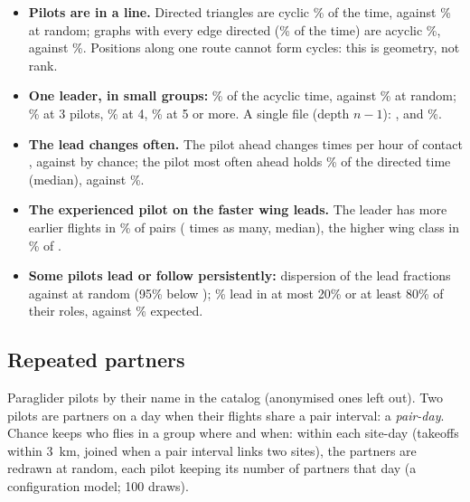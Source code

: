 \begin{itemize}
  \item \textbf{Pilots are in a line.} Directed triangles are cyclic \StCyclic\% \StCyclicBand{} of the
        time, against \StCyclicNull\% at random; graphs with every edge directed (\StFullShare\% of the
        time) are acyclic \StAcyclic\%, against \StAcyclicNull\%. Positions along one route cannot form
        cycles: this is geometry, not rank.
  \item \textbf{One leader, in small groups:} \StOneLeader\% \StOneLeaderBand{} of the acyclic time,
        against \StOneLeaderNull\% \StOneLeaderNullBand{} at random; \StOneLeaderThree\% at 3 pilots,
        \StOneLeaderFour\% at 4, \StOneLeaderFive\% at 5 or more. A single file (depth $n-1$):
        \StLineThree, \StLineFour{} and \StLineFive\%.
  \item \textbf{The lead changes often.} The pilot ahead changes \StSwitches{} times per hour of contact
        \StSwitchesBand{}, against \StSwitchesChance{} \StSwitchesChanceBand{} by chance; the pilot most
        often ahead holds \StDominant\% of the directed time (median), against \StDominantChance\%.
  \item \textbf{The experienced pilot on the faster wing leads.} The leader has more earlier flights in
        \StExp\% \StExpBand{} of \StExpPairs{} pairs (\StExpRatio{} times as many, median), the higher
        wing class in \StWing\% \StWingBand{} of \StWingPairs.
  \item \textbf{Some pilots lead or follow persistently:} dispersion of the lead fractions
        \HabitualDispersion{} against \HabitualNull{} at random (95\% below \HabitualNullHigh);
        \HabitualExtreme\% lead in at most 20\% or at least 80\% of their roles, against
        \HabitualExtremeNull\% expected.
\end{itemize}

\subsection{Repeated partners}\label{sec:partners}

Paraglider pilots by their name in the catalog (anonymised ones left out). Two pilots are partners
on a day when their flights share a pair interval: a \emph{pair-day}. Chance keeps who flies in a
group where and when: within each site-day (takeoffs within 3~km, joined when a pair interval links
two sites), the partners are redrawn at random, each pilot keeping its number of partners that day
(a configuration model; 100 draws).

